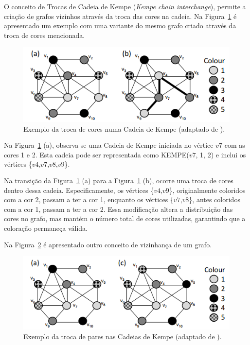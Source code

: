 O conceito de Trocas de Cadeia de Kempe (\textit{Kempe chain interchange}), permite a criação de grafos vizinhos através da troca das cores na cadeia. Na Figura~\ref{fig:exemplo-kempe-chain-neighbourhood-1} é apresentado um exemplo com uma variante do mesmo grafo criado através da troca de cores mencionada.

\begin{figure}[H]
    \centering
    \includegraphics[width=.85\linewidth]{Imagens/exemplo-kempe-chain-neighbourhood-1}
    \caption{Exemplo da troca de cores numa Cadeia de Kempe (adaptado de \cite{GuideGraphColouring-Lewis-2016}).}
    \label{fig:exemplo-kempe-chain-neighbourhood-1}
\end{figure}

Na Figura~\ref{fig:exemplo-kempe-chain-neighbourhood-1} (a), observa-se uma Cadeia de Kempe iniciada no vértice $v7$ com as cores 1 e 2. Esta cadeia pode ser representada como KEMPE($v7$, 1, 2) e inclui os vértices \{$v4$,$v7$,$v8$,$v9$\}.

Na transição da Figura~\ref{fig:exemplo-kempe-chain-neighbourhood-1} (a) para a Figura~\ref{fig:exemplo-kempe-chain-neighbourhood-1} (b), ocorre uma troca de cores dentro dessa cadeia. Especificamente, os vértices \{$v4$,$v9$\}, originalmente coloridos com a cor 2, passam a ter a cor 1, enquanto os vértices \{$v7$,$v8$\}, antes coloridos com a cor 1, passam a ter a cor 2. Essa modificação altera a distribuição das cores no grafo, mas mantém o número total de cores utilizadas, garantindo que a coloração permaneça válida.

Na Figura~\ref{fig:exemplo-kempe-chain-neighbourhood-2} é apresentado outro conceito de vizinhança de um grafo.

\begin{figure}[H]
    \centering
    \includegraphics[width=.85\linewidth]{Imagens/exemplo-kempe-chain-neighbourhood-2}
    \caption{Exemplo da troca de pares nas Cadeias de Kempe (adaptado de \cite{GuideGraphColouring-Lewis-2016}).}
    \label{fig:exemplo-kempe-chain-neighbourhood-2}
\end{figure}

